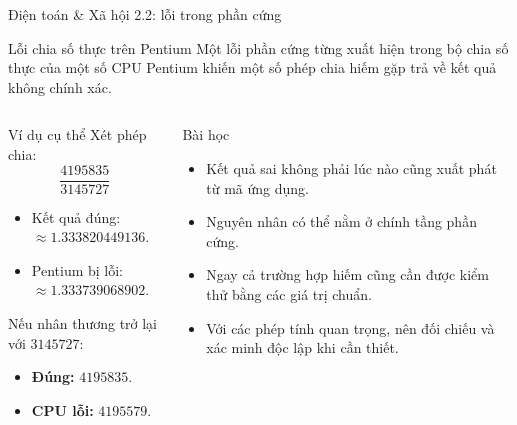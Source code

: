 \documentclass[aspectratio=169,10pt]{beamer}
\begin{document}
\begin{frame}{Điện toán \& Xã hội 2.2: lỗi trong phần cứng}
\small
\begin{block}{Lỗi chia số thực trên Pentium}
Một lỗi phần cứng từng xuất hiện trong bộ chia số thực của một số CPU Pentium khiến một số phép chia hiếm gặp trả về kết quả không chính xác.
\end{block}
\vspace{0.16cm}
\begin{columns}[T,totalwidth=0.92\textwidth]
\begin{block}{Ví dụ cụ thể}
\scriptsize
Xét phép chia:
\[
\frac{4195835}{3145727}
\]
\begin{itemize}
  \item Kết quả đúng: $\approx 1.333820449136$.
  \item Pentium bị lỗi: $\approx 1.333739068902$.
\end{itemize}
Nếu nhân thương trở lại với $3145727$:
\begin{itemize}
  \item \textbf{Đúng:} $4195835$.
  \item \textbf{CPU lỗi:} $4195579$.
\end{itemize}
\end{block}
\hfill
{}
\begin{block}{Bài học}
\scriptsize
\begin{itemize}
  \item Kết quả sai không phải lúc nào cũng xuất phát từ mã ứng dụng.
  \item Nguyên nhân có thể nằm ở chính tầng phần cứng.
  \item Ngay cả trường hợp hiếm cũng cần được kiểm thử bằng các giá trị chuẩn.
  \item Với các phép tính quan trọng, nên đối chiếu và xác minh độc lập khi cần thiết.
\end{itemize}
\end{block}
\end{columns}
\end{frame}
\end{document}
